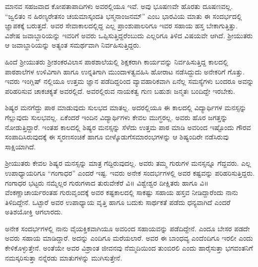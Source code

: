 {ಮಾನವ ಸಹಜವಾದ ಕೋಪತಾಪಾದಿಗಳು ಅವರಲ್ಲಿಯೂ ಇವೆ. ಅವು ಭೂಷಣವೇ ಹೊರತು ದೂಷಣವಲ್ಲ. “ಜ್ವಲಿತಂ ನ ಹಿರಣ್ಯರೇತಸಂ ಚಯಮಾಸ್ಕಂದತಿ ಭಸ್ಮನಾಂಜನಮ್” ಎಂಬ ಭಾರವಿಯ ಮಾತು ಈ ಸಂದರ್ಭದಲ್ಲಿ ಜ್ಞಾಪಕಕ್ಕೆ ಬರುತ್ತದೆ. ಅವರ ಸೇವಾಕಾಲದಲ್ಲಿದ್ದ ಎಲ್ಲ ಪ್ರಾಂಶುಪಾಲರಿಗೂ ಇವರ ಸಹಾಯ ಹಸ್ತ ಬೇಕಾಗುತ್ತಿತ್ತು. ವಿಶೇಷ ಜವಾಬ್ದಾರಿಯನ್ನು ಇವರಿಗೆ ಅವರು ಒಪ್ಪಿಸುತ್ತಿದ್ದರೆಂಬುದು ಎಲ್ಲರಿಗೂ ತಿಳಿದ ವಿಷಯವೇ ಆಗಿದೆ. ಶ್ರೀಯುತರು ಆ ಜವಾಬ್ದಾರಿಯನ್ನು ಅತ್ಯಂತ ಸಮರ್ಥವಾಗಿ ನಿರ್ವಹಿಸುತ್ತಿದ್ದರು.

ಹಿಂದೆ ಶ್ರೀಯುತರು ಶ್ರೀಶಂಕರವಿಲಾಸ ಪಾಠಶಾಲೆಯಲ್ಲಿ ಶಿಕ್ಷಕರಾಗಿ ಕಾರ್ಯವನ್ನು ನಿರ್ವಹಿಸುತ್ತಿದ್ದ ಕಾಲದಲ್ಲಿ ಪಾಠಶಾಲೆಗಳ ಉಳಿವಿಗಾಗಿ ಹಾಗೂ ಉನ್ನತಿಗಾಗಿ ಮುಂದಾಳತ್ವವಹಿಸಿ ಹೋರಾಟ ನಡೆಸಿದ್ದುದು ಅನೇಕರಿಗೆ ಗೊತ್ತು. ಇವರು ಇಂಗ್ಲಿಷ್ ನಲ್ಲಿಯೂ ಉತ್ತಮ ಜ್ಞಾನ ಪಡೆದಿದ್ದರಿಂದ ವ್ಯಾವಹಾರಿಕವಾಗಿ ಏನೆಲ್ಲ ಸಮಸ್ಯೆಗಳು ಬಂದರೂ ಅವನ್ನು ಪರಿಹರಿಸುವ ಚಾಕಚಕ್ಯತೆ ಅವರಲ್ಲಿದೆ. ಅವರಲ್ಲಿರುವ ನಾಯಕತ್ವ ಗುಣ ಬಹುಶಃ ಜನ್ಮತಃ ಬಂದಿದ್ದೇ ಇರಬೇಕು.

ಶಿಷ್ಯರ ಮನಗೆದ್ದು ಪಾಠ ಮಾಡುವುದು ಸುಲಭದ ಮಾತಲ್ಲ. ಅದರಲ್ಲಿಯೂ ಈ ಕಾಲದಲ್ಲಿ ವಿದ್ಯಾರ್ಥಿಗಳ ಮನಸ್ಸನ್ನು ಗೆಲ್ಲುವುದು ಸುಲಭವಲ್ಲ. ಏಕೆಂದರೆ ಇಂದಿನ ವಿದ್ಯಾರ್ಥಿಗಳು ಕೇವಲ ಮುಗ್ಧರಲ್ಲ. ಅವರು ಹೊರ ಜಗತ್ತನ್ನು ನೋಡುತ್ತಿದ್ದಾರೆ. ಇಂತಹ ಕಾಲದಲ್ಲಿ ಶಿಷ್ಯರ ಮನಸ್ಸನ್ನು ಸೆಳೆದು ಉತ್ತಮ ಪಾಠ ಮಾಡಿ ಅವರಿಂದ ಇಷ್ಟೊಂದು ಗೌರವ ಸಂಪಾದಿಸಿರುವುದಕ್ಕೆ ಈ ಸ್ಮರಣಸಂಚಿಕೆ ಹಾಗೂ ಬೀಳ್ಕೊಡುಗೆ\break ಸಮಾರಂಭಗಳನ್ನು ಆ ಶಿಷ್ಯಂದಿರೇ ನಡೆಸಿರುವು ಸಾಕ್ಷಿಯಾಗಿದೆ.

ಶ್ರೀಯುತರು ಕೇವಲ ಶಿಷ್ಯರ ಮನಸ್ಸನ್ನು  ಮಾತ್ರ ಗೆದ್ದಿರುವುದಲ್ಲ. ಅವರು ತಮ್ಮ ಗುರುಗಳ ಮನಸ್ಸನ್ನೂ ಗೆದ್ದವರು. ಎಲ್ಲ ಉಪಾಧ್ಯಾಯರಿಗೂ “ಗಂಗಾಧರ” ಎಂದರೆ ಇಷ್ಟ. ಇವರು ಅನೇಕ ಸಂದರ್ಭಗಳಲ್ಲಿ ಅವರ ಕಷ್ಟವನ್ನು ಪರಿಹರಿಸುತ್ತಿದ್ದರು. ಗಂಗಾಧರ ಭಟ್ಟರು ನಮ್ಮೆಲ್ಲರ ಗುರುಗಳಾದ ತುರುವೇಕೆರೆ ವಿ॥ ವಿಶ್ವೇಶ್ವರ ದೀಕ್ಷಿತರು ಹಾಗೂ ವಿ॥ ವೆಂಕಣ್ಣಾಚಾರ್ಯರಂತಹ ಗುರುವೃಂದಕ್ಕೆ ಅವರ ಕಷ್ಟಕಾಲದಲ್ಲಿ ಸಾಕಷ್ಟು ಸಹಾಯ ಹಸ್ತವ ನೀಡಿದ್ದಾರೆಂದು ನಾನು ತಿಳಿದಿದ್ದೇನೆ. ಒಟ್ಟಾರೆ ಅವರ ಉಪಾಧ್ಯಾಯ ವೃತ್ತಿ ಹಾಗೂ ಬದುಕು ಸಾರ್ಥಕತೆ ಪಡೆದು ಧನ್ಯವಾಗಿದೆ ಎಂದರೆ ಅತಿಶಯೋಕ್ತಿ ಆಗಲಾರದು.

ಅನೇಕ ಸಂದರ್ಭಗಳಲ್ಲಿ ನಾನು ವೈಯಕ್ತಿಕವಾಗಿಯೂ ಅವರಿಂದ ಸಹಾಯವನ್ನು ಪಡೆದಿದ್ದೇನೆ. ಎಂದೂ ಬೇಸರ ಪಡದೇ ಅವರು ಸಹಾಯ ಮಾಡಿದ್ದಾರೆ. ಅದನ್ನು ಎಂದಿಗೂ ಮರೆಯಲಾರೆ. ಅವರ ಈ ಬಾಂಧವ್ಯ ಎಂದೆಂದಿಗೂ ಇರಲೀ ಎಂದು ಕೇಳಿಕೊಳ್ಳುತ್ತೇನೆ. ಅಂತೆಯೇ ಅವರ ವಿಶ್ರಾಂತ ಜೀವನವು ನೆಮ್ಮದಿಯಿಂದ ತುಂಬಿರಲಿ ಎಂದು ಹಾರೈಸುತ್ತಾ ಭಗವಂತನಿಗೆ ನಮಸ್ಕರಿಸುತ್ತಾ ನನ್ನೆರಡು ಮಾತುಗಳನ್ನು ಮುಗಿಸುತ್ತೇನೆ.

\articleend
}

